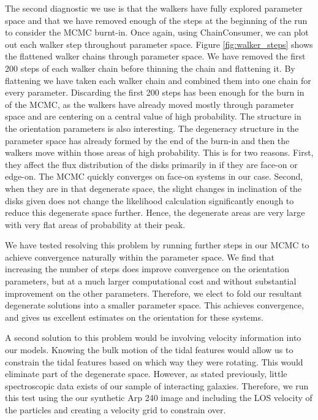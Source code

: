 The second diagnostic we use is that the walkers have fully explored parameter space and that we have removed enough of the steps at the beginning of the run to consider the MCMC burnt-in. Once again, using ChainConsumer, we can plot out each walker step throughout parameter space. Figure \ref{fig:walker_steps} shows the flattened walker chains through parameter space. We have removed the first 200 steps of each walker chain before thinning the chain and flattening it. By flattening we have taken each walker chain and combined them into one chain for every parameter. Discarding the first 200 steps has been enough for the burn in of the MCMC, as the walkers have already moved mostly through parameter space and are centering on a central value of high probability. The structure in the orientation parameters is also interesting. The degeneracy structure in the parameter space has already formed by the end of the burn-in and then the walkers move within those areas of high probability. This is for two reasons. First, they affect the flux distribution of the disks primarily in if they are face-on or edge-on. The MCMC quickly converges on face-on systems in our case. Second, when they are in that degenerate space, the slight changes in inclination of the disks given does not change the likelihood calculation significantly enough to reduce this degenerate space further. Hence, the degenerate areas are very large with very flat areas of probability at their peak.

We have tested resolving this problem by running further steps in our MCMC to achieve convergence naturally within the parameter space. We find that increasing the number of steps does improve convergence on the orientation parameters, but at a much larger computational cost and without substantial improvement on the other parameters. Therefore, we elect to fold our resultant degenerate solutions into a smaller parameter space. This achieves convergence, and gives us excellent estimates on the orientation for these systems.

A second solution to this problem would be involving velocity information into our models. Knowing the bulk motion of the tidal features would allow us to constrain the tidal features based on which way they were rotating. This would eliminate part of the degenerate space. However, as stated previously, little spectroscopic data exists of our sample of interacting galaxies. Therefore, we run this test using the our synthetic Arp 240 image and including the LOS velocity of the particles and creating a velocity grid to constrain over.

